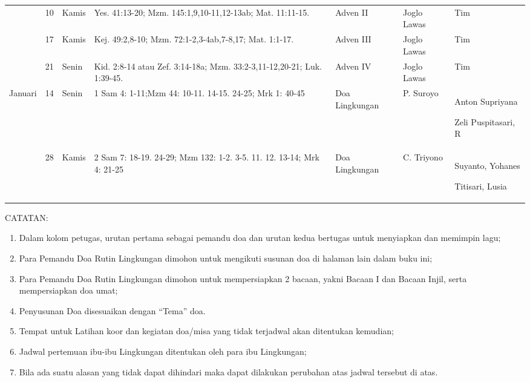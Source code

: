 \begin{flushleft}
\begin{longtable}{|m{1.2cm}|m{0.4cm}|m{0.9cm}|m{2.6cm}|m{2.1cm}|m{1.5cm}|m{3.1cm}|}
&	10& 	Kamis& 	Yes. 41:13-20; Mzm. 145:1,9,10-11,12-13ab; Mat. 11:11-15.& 	Adven II& 	Joglo Lawas& 	Tim\par  \\	\cline{2-7}
&	17& 	Kamis& 	Kej. 49:2,8-10; Mzm. 72:1-2,3-4ab,7-8,17; Mat. 1:1-17.& 	Adven III& 	Joglo Lawas& 	Tim\par  \\	\cline{2-7}
&	21& 	Senin& 	Kid. 2:8-14 atau Zef. 3:14-18a; Mzm. 33:2-3,11-12,20-21; Luk. 1:39-45.& 	Adven IV& 	Joglo Lawas& 	Tim\par  \\	\hline
Januari&	14& 	Senin& 	1 Sam 4: 1-11;Mzm 44: 10-11. 14-15. 24-25; Mrk 1: 40-45& 	Doa Lingkungan& 	P. Suroyo& 	Anton Supriyana\par  Zeli Puspitasari, R\\	\cline{2-7}
&	28& 	Kamis& 	2 Sam 7: 18-19. 24-29; Mzm 132: 1-2. 3-5. 11. 12. 13-14; Mrk 4: 21-25& 	Doa Lingkungan& 	C. Triyono& 	Suyanto, Yohanes\par  Titisari, Lusia\\	\hline
\end{longtable}
\normalsize
\end{flushleft}
CATATAN:

\begin{enumerate}
\item Dalam kolom petugas, urutan pertama sebagai pemandu doa dan urutan
kedua bertugas untuk menyiapkan dan memimpin lagu;
\item Para Pemandu Doa Rutin Lingkungan dimohon untuk mengikuti susunan
doa di halaman lain dalam buku ini;
\item Para Pemandu Doa Rutin Lingkungan dimohon untuk mempersiapkan 2
bacaan, yakni Bacaan I dan Bacaan Injil, serta mempersiapkan doa umat;
\item Penyusunan Doa disesuaikan dengan
{\textquotedblleft}Tema{\textquotedblright} doa. 
\item Tempat untuk Latihan koor dan kegiatan doa/misa yang tidak
terjadwal akan ditentukan kemudian;
\item Jadwal pertemuan ibu-ibu Lingkungan ditentukan oleh para ibu
Lingkungan;
\item Bila ada suatu alasan yang tidak dapat dihindari maka dapat
dilakukan perubahan atas jadwal tersebut di atas. 
\end{enumerate}

